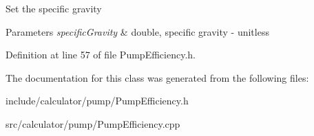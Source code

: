 Set the specific gravity 
\begin{DoxyParams}{Parameters}
{\em specific\+Gravity} & double, specific gravity -\/ unitless \\
\hline
\end{DoxyParams}


Definition at line 57 of file Pump\+Efficiency.\+h.



The documentation for this class was generated from the following files\+:\begin{DoxyCompactItemize}
\item 
include/calculator/pump/Pump\+Efficiency.\+h\item 
src/calculator/pump/Pump\+Efficiency.\+cpp\end{DoxyCompactItemize}
